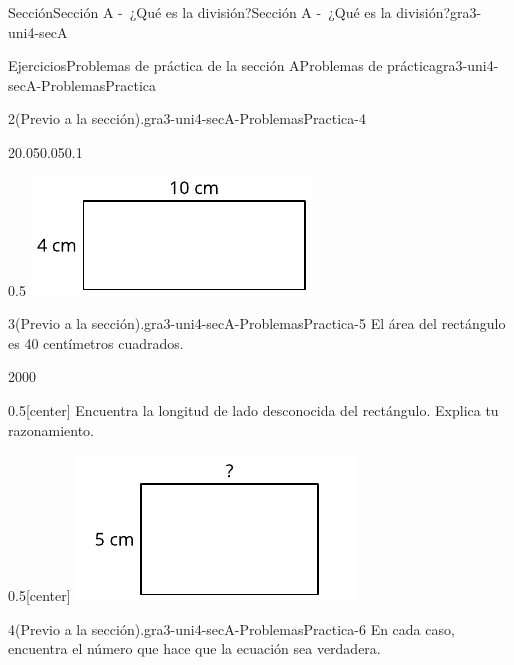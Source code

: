 \documentclass[twoside,10pt,]{article}
\begin{document}
\begin{sectionptx}{Sección}{Sección A -~¿Qué es la división?}{}{Sección A -~¿Qué es la división?}{}{}{gra3-uni4-secA}
\begin{exercises-subsection}{Ejercicios}{Problemas de práctica de la sección A}{}{Problemas de práctica}{}{}{gra3-uni4-secA-ProblemasPractica}
\begin{divisionexercise}{2}{(Previo a la sección).}{}{gra3-uni4-secA-ProblemasPractica-4}
\begin{sidebyside}{2}{0.05}{0.05}{0.1}
\begin{sbspanel}{0.5}
\includegraphics[width=\linewidth]{external/svg-source/tikz-file-151670.pdf}
\end{sbspanel}%
\end{sidebyside}%
\end{divisionexercise}%
\begin{divisionexercise}{3}{(Previo a la sección).}{}{gra3-uni4-secA-ProblemasPractica-5}%
El área del rectángulo es 40 centímetros cuadrados.%
\begin{sidebyside}{2}{0}{0}{0}%
\begin{sbspanel}{0.5}[center]%
Encuentra la longitud de lado desconocida del rectángulo. Explica tu razonamiento.%
\end{sbspanel}%
\begin{sbspanel}{0.5}[center]%
\includegraphics[width=\linewidth]{external/svg-source/tikz-file-151673.pdf}
\end{sbspanel}%
\end{sidebyside}%
\end{divisionexercise}%
\begin{divisionexercise}{4}{(Previo a la sección).}{}{gra3-uni4-secA-ProblemasPractica-6}%
En cada caso, encuentra el número que hace que la ecuación sea verdadera.%
\par
%
\begin{enumerate}[label=(\alph*)]

\end{enumerate}
\end{divisionexercise}
\end{exercises-subsection}
\end{sectionptx}
\end{document}
